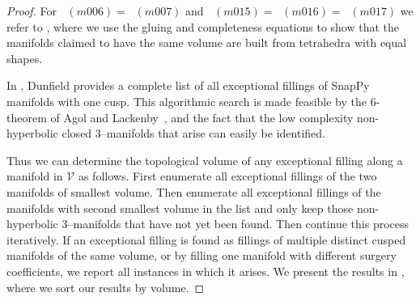 \documentclass[a4paper]{gtart}
\theoremstyle{definition}
\theoremstyle{remark}
\numberwithin{equation}{section}
\DeclareMathOperator{\volh}{vol_{\mathbb{H}}}
\begin{document}
\begin{proof}
For $\volh(m006) = \volh(m007)$ and $\volh(m015) = \volh(m016)= \volh(m017)$ we refer to , where we use the gluing and completeness equations to show that the manifolds claimed to have the same volume are built from tetrahedra with equal shapes.

In \cite{Du20}, Dunfield provides a complete list of all exceptional fillings of SnapPy \cite{snappy} manifolds with one cusp. This algorithmic search is made feasible by the $6$-theorem of Agol and Lackenby~\cite{agol-bounds,lackenby-6}, and the fact that the low complexity non-hyperbolic closed 3--manifolds that arise can easily be identified.
 
Thus we can determine the topological volume of any exceptional filling along a manifold in $\mathcal V$ as follows. First enumerate all exceptional fillings of the two manifolds of smallest volume. Then enumerate all exceptional fillings of the manifolds with second smallest volume in the list and only keep those non-hyperbolic 3--manifolds that have not yet been found. Then continue this process iteratively. If an exceptional filling is found as fillings of multiple distinct cusped manifolds of the same volume, or by filling one manifold with different surgery coefficients, we report all instances in which it arises. We present the results in , where we sort our results by volume. 
\end{proof}
\end{document}
